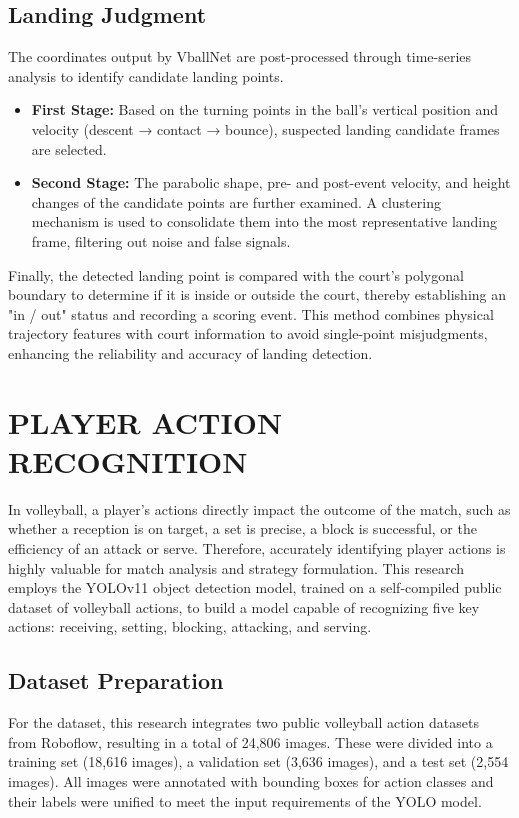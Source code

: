 \documentclass[journal]{IEEEtran}
\begin{document}
\subsection{Landing Judgment}
The coordinates output by VballNet are post-processed through time-series analysis to identify candidate landing points.
\begin{itemize}
\item \textbf{First Stage:} Based on the turning points in the ball's vertical position and velocity (descent → contact → bounce), suspected landing candidate frames are selected.
\item \textbf{Second Stage:} The parabolic shape, pre- and post-event velocity, and height changes of the candidate points are further examined. A clustering mechanism is used to consolidate them into the most representative landing frame, filtering out noise and false signals.
\end{itemize}

Finally, the detected landing point is compared with the court's polygonal boundary to determine if it is inside or outside the court, thereby establishing an "in / out" status and recording a scoring event. This method combines physical trajectory features with court information to avoid single-point misjudgments, enhancing the reliability and accuracy of landing detection.

\section{PLAYER ACTION RECOGNITION}

In volleyball, a player's actions directly impact the outcome of the match, such as whether a reception is on target, a set is precise, a block is successful, or the efficiency of an attack or serve. Therefore, accurately identifying player actions is highly valuable for match analysis and strategy formulation. This research employs the YOLOv11 object detection model, trained on a self-compiled public dataset of volleyball actions, to build a model capable of recognizing five key actions: receiving, setting, blocking, attacking, and serving.

\subsection{Dataset Preparation}
For the dataset, this research integrates two public volleyball action datasets from Roboflow, resulting in a total of 24,806 images. These were divided into a training set (18,616 images), a validation set (3,636 images), and a test set (2,554 images). All images were annotated with bounding boxes for action classes and their labels were unified to meet the input requirements of the YOLO model.
\end{document}
